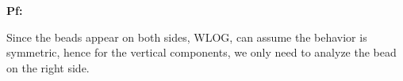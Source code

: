 \documentclass{article}
\newcommand{\br}{\overline{r}}
\newcommand{\bF}{\overline{F}}
\begin{document}
\textbf{Pf:}

Since the beads appear on both sides, WLOG, can assume the behavior is symmetric, hence for the vertical components, we only need to analyze the bead on the right side.

\end{document}

